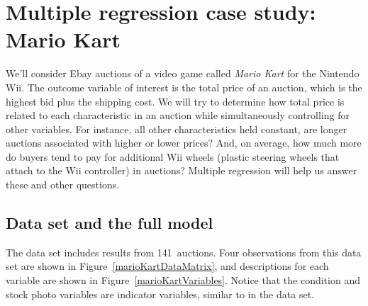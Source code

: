 

{}






\section{Multiple regression case study: Mario Kart}
\label{mario_kart_case_study}

\noindent%
We'll consider Ebay auctions of a video game called
\emph{Mario Kart} for the Nintendo Wii.
The outcome variable of interest is the total price of
an auction, which is the highest bid plus the shipping cost.
We will try to determine how total price is related to each
characteristic in an auction while simultaneously controlling
for other variables.
For instance, all other characteristics held constant,
are longer auctions associated with higher or lower prices?
And, on average, how much more do buyers tend to pay for
additional Wii wheels
(plastic steering wheels that attach to the Wii controller)
in auctions?
Multiple regression will help us answer these and other questions.

\newcommand{\mknum}{141}


\subsection{Data set and the full model}

The  data set includes results
from \mknum{}~auctions.
Four observations from this data set are shown in
Figure~\ref{marioKartDataMatrix},
and descriptions for each variable are shown in
Figure~\ref{marioKartVariables}. 
Notice that the condition and stock photo variables
are indicator variables,
similar to  in the  data set.

